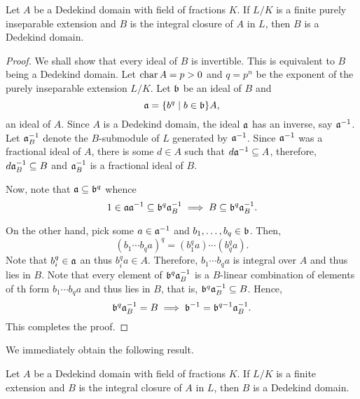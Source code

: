 \begin{theorem}
    Let $A$ be a Dedekind domain with field of fractions $K$. If $L/K$ is a finite purely inseparable extension and $B$ is the integral closure of $A$ in $L$, then $B$ is a Dedekind domain.
\end{theorem}
\begin{proof}
    We shall show that every ideal of $B$ is invertible. This is equivalent to $B$ being a Dedekind domain. Let $\operatorname{char} A = p > 0$ and $q = p^n$ be the exponent of the purely inseparable extension $L/K$. Let $\mathfrak b$ be an ideal of $B$ and 
    \begin{equation*}
        \mathfrak a = \{b^q\mid b\in\mathfrak b\}A,
    \end{equation*}
    an ideal of $A$. Since $A$ is a Dedekind domain, the ideal $\mathfrak a$ has an inverse, say $\mathfrak a^{-1}$. Let $\mathfrak a^{-1}_B$ denote the $B$-submodule of $L$ generated by $\mathfrak a^{-1}$. Since $\mathfrak a^{-1}$ was a fractional ideal of $A$, there is some $d\in A$ such that $d\mathfrak a^{-1}\subseteq A$, therefore, $d\mathfrak a^{-1}_B\subseteq B$ and $\mathfrak a^{-1}_B$ is a fractional ideal of $B$.

    Now, note that $\mathfrak a\subseteq\mathfrak b^q$ whence 
    \begin{equation*}
        1\in\mathfrak a\mathfrak a^{-1}\subseteq\mathfrak b^q\mathfrak a_B^{-1}\implies B\subseteq\mathfrak b^q\mathfrak a^{-1}_B.
    \end{equation*}
    
    On the other hand, pick some $a\in\mathfrak a^{-1}$ and $b_1,\dots,b_q\in\mathfrak b$. Then, 
    \begin{equation*}
        (b_1\cdots b_q a)^q = (b_1^qa)\cdots(b_q^qa).
    \end{equation*}
    Note that $b_i^q\in\mathfrak a$ an thus $b_i^qa\in A$. Therefore, $b_1\cdots b_qa$ is integral over $A$ and thus lies in $B$. Note that every element of $\mathfrak b^q\mathfrak a_B^{-1}$ is a $B$-linear combination of elements of th form $b_1\cdots b_qa$ and thus lies in $B$, that is, $\mathfrak b^q\mathfrak a_B^{-1}\subseteq B$. Hence, 
    \begin{equation*}
        \mathfrak b^q\mathfrak a^{-1}_B = B\implies\mathfrak b^{-1} = \mathfrak b^{q - 1}\mathfrak a^{-1}_B.
    \end{equation*}
    This completes the proof.
\end{proof}

We immediately obtain the following result.

\begin{corollary}
    Let $A$ be a Dedekind domain with field of fractions $K$. If $L/K$ is a finite extension and $B$ is the integral closure of $A$ in $L$, then $B$ is a Dedekind domain.
\end{corollary}

